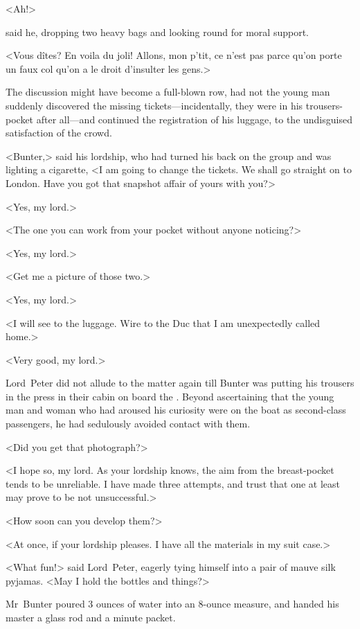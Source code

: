 \begin{french}<Ah!>\end{french} said he, dropping two heavy bags and looking round for moral support. \begin{french}<Vous dîtes? En voila du joli! Allons, mon p'tit, ce n'est pas parce qu'on porte un faux col qu'on a le droit d'insulter les gens.>\end{french}

The discussion might have become a full-blown row, had not the young man suddenly discovered the missing tickets—incidentally, they were in his trousers-pocket after all—and continued the registration of his luggage, to the undisguised satisfaction of the crowd.

<Bunter,> said his lordship, who had turned his back on the group and was lighting a cigarette, <I am going to change the tickets. We shall go straight on to London. Have you got that snapshot affair of yours with you?>

<Yes, my lord.>

<The one you can work from your pocket without anyone noticing?>

<Yes, my lord.>

<Get me a picture of those two.>

<Yes, my lord.>

<I will see to the luggage. Wire to the Duc that I am unexpectedly called home.>

<Very good, my lord.>

Lord~Peter did not allude to the matter again till Bunter was putting his trousers in the press in their cabin on board the . Beyond ascertaining that the young man and woman who had aroused his curiosity were on the boat as second-class passengers, he had sedulously avoided contact with them.

<Did you get that photograph?>

<I hope so, my lord. As your lordship knows, the aim from the breast-pocket tends to be unreliable. I have made three attempts, and trust that one at least may prove to be not unsuccessful.>

<How soon can you develop them?>

<At once, if your lordship pleases. I have all the materials in my suit case.>

<What fun!> said Lord~Peter, eagerly tying himself into a pair of mauve silk pyjamas. <May I hold the bottles and things?>

Mr~Bunter poured 3 ounces of water into an 8-ounce measure, and handed his master a glass rod and a minute packet.


